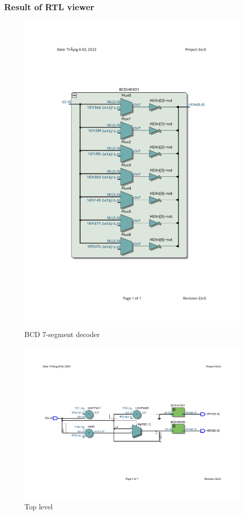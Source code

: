 \documentclass[13pt,a4paper]{report}
\begin{document}
\subsubsection{Result of RTL viewer}
\begin{figure}[H]
\centering
\includegraphics[scale=0.7, clip, trim={2cm 6.6cm 2cm 6.9cm}]{images/Exc5_BCD_RTL.pdf}
\caption*{BCD 7-segment decoder}
\end{figure}

\begin{figure}[H]
\centering
\includegraphics[scale=0.7, clip, trim={2cm 7cm 2cm 7cm}]{images/Exc5_RTL_2.pdf}
\caption*{Top level}
\end{figure}
\end{document}
